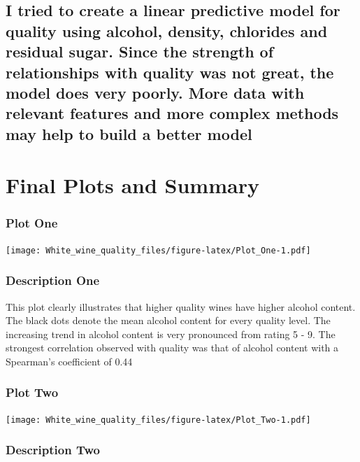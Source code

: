 \documentclass[]{article}
\begin{document}
\subsection{I tried to create a linear predictive model for quality
using alcohol, density, chlorides and residual sugar. Since the strength
of relationships with quality was not great, the model does very poorly.
More data with relevant features and more complex methods may help to
build a better
model}\label{i-tried-to-create-a-linear-predictive-model-for-quality-using-alcohol-density-chlorides-and-residual-sugar.-since-the-strength-of-relationships-with-quality-was-not-great-the-model-does-very-poorly.-more-data-with-relevant-features-and-more-complex-methods-may-help-to-build-a-better-model}

\section{Final Plots and Summary}\label{final-plots-and-summary}

\subsubsection{Plot One}\label{plot-one}

\texttt{[image: White\_wine\_quality\_files/figure-latex/Plot\_One-1.pdf]}

\subsubsection{Description One}\label{description-one}

This plot clearly illustrates that higher quality wines have higher
alcohol content. The black dots denote the mean alcohol content for
every quality level. The increasing trend in alcohol content is very
pronounced from rating 5 - 9. The strongest correlation observed with
quality was that of alcohol content with a Spearman's coefficient of
0.44

\subsubsection{Plot Two}\label{plot-two}

\texttt{[image: White\_wine\_quality\_files/figure-latex/Plot\_Two-1.pdf]}

\subsubsection{Description Two}\label{description-two}
\end{document}
